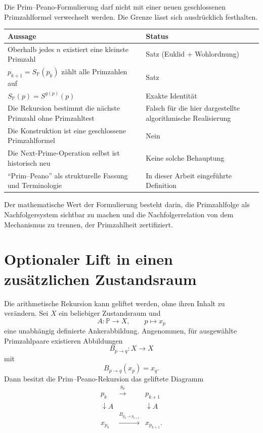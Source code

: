 \documentclass[11pt]{article}
\theoremstyle{definition}
\newcommand{\Pp}{\mathbb{P}}
\newcommand{\SP}{S_{\!\Pp}}
\newcommand{\gap}{g}
\begin{document}
Die Prim--Peano-Formulierung darf nicht mit einer neuen geschlossenen Primzahlformel verwechselt werden. Die Grenze lässt sich ausdrücklich festhalten.

\begin{center}
\begin{tabular}{@{}p{}p{}@{}}
\toprule
\textbf{Aussage} & \textbf{Status}\\
\midrule
Oberhalb jedes $n$ existiert eine kleinste Primzahl & Satz (Euklid + Wohlordnung)\\
$p_{k+1}=\SP(p_k)$ zählt alle Primzahlen auf & Satz\\
$\SP(p)=S^{\gap(p)}(p)$ & Exakte Identität\\
Die Rekursion bestimmt die nächste Primzahl ohne Primzahltest & Falsch für die hier dargestellte algorithmische Realisierung\\
Die Konstruktion ist eine geschlossene Primzahlformel & Nein\\
Die Next-Prime-Operation selbst ist historisch neu & Keine solche Behauptung\\
``Prim--Peano'' als strukturelle Fassung und Terminologie & In dieser Arbeit eingeführte Definition\\
\bottomrule
\end{tabular}
\end{center}

Der mathematische Wert der Formulierung besteht darin, die Primzahlfolge als Nachfolgersystem sichtbar zu machen und die Nachfolgerrelation von dem Mechanismus zu trennen, der Primzahlheit zertifiziert.

\section{Optionaler Lift in einen zusätzlichen Zustandsraum}

Die arithmetische Rekursion kann geliftet werden, ohne ihren Inhalt zu verändern. Sei $X$ ein beliebiger Zustandsraum und
\[
A:\Pp\to X,\qquad p\mapsto x_p
\]
eine unabhängig definierte Ankerabbildung. Angenommen, für ausgewählte Primzahlpaare existieren Abbildungen
\[
B_{p\to q}:X\to X
\]
mit
\[
B_{p\to q}(x_p)=x_q.
\]
Dann besitzt die Prim--Peano-Rekursion das geliftete Diagramm
\[
\begin{array}{ccc}
p_k & \xrightarrow{\SP} & p_{k+1}\\
\downarrow A && \downarrow A\\
x_{p_k} & \xrightarrow{B_{p_k\to p_{k+1}}} & x_{p_{k+1}}.
\end{array}
\]
\end{document}
